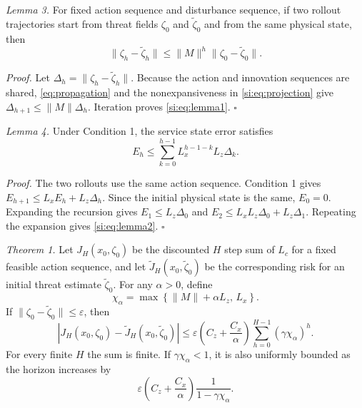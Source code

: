 \textit{Lemma 3.}  For fixed action sequence and disturbance sequence, if two
rollout trajectories start from threat fields $\zeta_0$ and $\tilde\zeta_0$ and
from the same physical state, then
\begin{equation}
\|\zeta_h-\tilde\zeta_h\|
\le\|M\|^h\|\zeta_0-\tilde\zeta_0\|.
\label{si:eq:lemma1}
\end{equation}

\textit{Proof.}  Let $\Delta_h=\|\zeta_h-\tilde\zeta_h\|$.
Because the action and innovation sequences are
shared, \eqref{eq:propagation} and the nonexpansiveness in
\eqref{si:eq:projection} give
$\Delta_{h+1}\le\|M\|\Delta_h$.  Iteration proves \eqref{si:eq:lemma1}.
\hfill $\square$

\textit{Lemma 4.}  Under Condition 1, the service state error satisfies
\begin{equation}
E_h\le
\sum_{k=0}^{h-1}L_x^{h-1-k}L_z\Delta_k .
\label{si:eq:lemma2}
\end{equation}

\textit{Proof.}  The two rollouts use the same action sequence.  Condition 1
gives $E_{h+1}\le L_xE_h+L_z\Delta_h$.  Since the initial physical state is the
same, $E_0=0$.  Expanding the recursion gives
$E_1\le L_z\Delta_0$ and
$E_2\le L_xL_z\Delta_0+L_z\Delta_1$.  Repeating the expansion gives
\eqref{si:eq:lemma2}.  \hfill $\square$

\textit{Theorem 1.}  Let $J_H(x_0,\zeta_0)$ be the discounted $H$ step sum of $L_c$ for
a fixed feasible action sequence, and let $\tilde J_H(x_0,\tilde\zeta_0)$ be the
corresponding risk for an initial threat estimate $\tilde\zeta_0$.  For any
$\alpha>0$, define
\begin{equation}
\chi_{\alpha}=
\max\left\{\|M\|+\alpha L_z,\,
L_x\right\}.
\end{equation}
If $\|\zeta_0-\tilde\zeta_0\|\le \varepsilon$, then
\begin{equation}
|J_H(x_0,\zeta_0)-\tilde J_H(x_0,\tilde\zeta_0)|
\le
\varepsilon \left(C_z+\frac{C_x}{\alpha}\right)
\sum_{h=0}^{H-1}(\gamma\chi_{\alpha})^h .
\label{si:eq:riskbound}
\end{equation}
For every finite $H$ the sum is finite.  If $\gamma\chi_{\alpha}<1$, it is also
uniformly bounded as the horizon increases by
\begin{equation}
\varepsilon \left(C_z+\frac{C_x}{\alpha}\right)
\frac{1}{1-\gamma\chi_{\alpha}}.
\end{equation}

